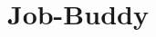 \chapter{Job-\/\+Buddy }
\hypertarget{md__r_e_a_d_m_e}{}\label{md__r_e_a_d_m_e}
\label{md__r_e_a_d_m_e_autotoc_md44}%
%
